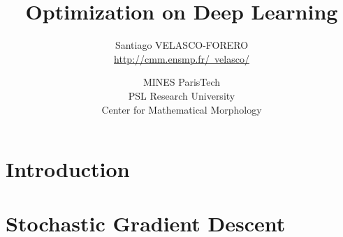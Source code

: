 \documentclass[xcolor=pdftex,dvipsnames,table,mathserif]{beamer}
\title{Optimization on Deep Learning}
\author{Santiago VELASCO-FORERO \\ \href{http://cmm.ensmp.fr/~velasco/}{http://cmm.ensmp.fr/~velasco/}}
\date{MINES ParisTech\\
  PSL Research University\\
  Center for Mathematical Morphology
}
\begin{document}
\begin{frame}
\titlepage
\end{frame}



\section{Introduction}


\section{Stochastic Gradient Descent}

%
%
\end{document}
